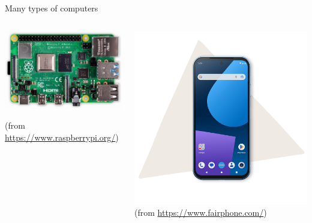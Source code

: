 \begin{frame}{Many types of computers \insertcontinuationtext}
  \begin{columns}[b]
    \begin{column}{.5\textwidth}
      \includegraphics[width=\textwidth,angle=270,origin=c]{images/rpi-compressed.png}

      {\tiny (from \url{https://www.raspberrypi.org/})}
    \end{column}
    \begin{column}{.5\textwidth}
      \includegraphics[trim={100 150 100 50},clip,width=\textwidth]{images/phone.png}
      {\tiny (from \url{https://www.fairphone.com/})}
    \end{column}
  \end{columns}
\end{frame}

